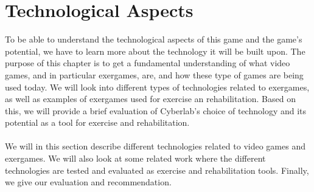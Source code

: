 \chapter{Technological Aspects}
To be able to understand the technological aspects of this game and the game's potential, we have to learn more about the technology it will be built upon.  The purpose of this chapter is to get a fundamental understanding of what video games, and in particular exergames, are, and how these type of games are being used today. We will look into different types of technologies related to exergames, as well as examples of exergames used for exercise an rehabilitation. Based on this, we will provide a brief evaluation of Cyberlab's choice of technology and its potential as a tool for exercise and rehabilitation.  \\ \\ 
We will in this section describe different technologies related to video games and exergames. We will also look at some related work where the different technologies are tested and evaluated as exercise and rehabilitation tools. Finally, we give our evaluation and recommendation.\\ \\

